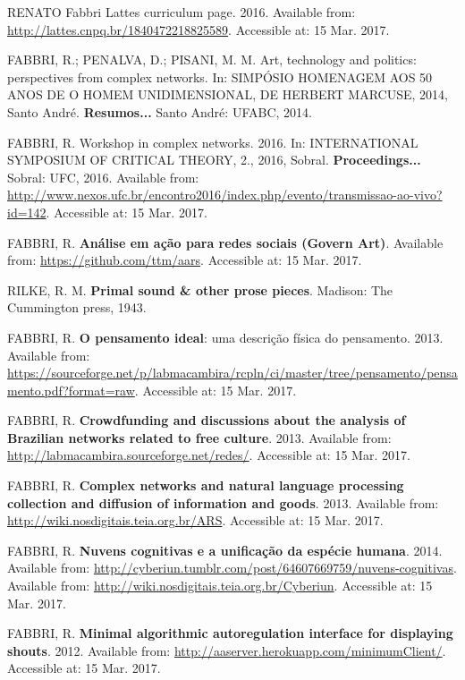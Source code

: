 \documentclass[
12pt,		%
openright,	%
twoside,  %
a4paper,			%
chapter=TITLE,		%
english,			%
french,				%
spanish,			%
brazil				%
]{USPSC}
\begin{document}
\begin{thebibliography}{999}
	RENATO Fabbri Lattes curriculum page. 2016. Available from: \url{http://lattes.cnpq.br/1840472218825589}. Accessible at: 15 Mar. 2017.

	FABBRI, R.; PENALVA, D.; PISANI, M. M. Art, technology and politics: perspectives from complex networks. In: SIMPÓSIO HOMENAGEM AOS 50 ANOS DE O HOMEM UNIDIMENSIONAL, DE HERBERT MARCUSE, 2014, Santo André. \textbf{Resumos...} Santo André: UFABC, 2014.

	FABBRI, R. Workshop in complex networks. 2016. In: INTERNATIONAL SYMPOSIUM OF CRITICAL THEORY, 2., 2016, Sobral. \textbf{Proceedings...} Sobral: UFC, 2016. Available from: \url{http://www.nexos.ufc.br/encontro2016/index.php/evento/transmissao-ao-vivo?id=142}. Accessible at: 15 Mar. 2017.

	FABBRI, R. \textbf{Análise em ação para redes sociais (Govern Art)}. Available from: \url{https://github.com/ttm/aars}. Accessible at: 15 Mar. 2017.

	RILKE, R. M. \textbf{Primal sound \& other prose pieces}. Madison: The Cummington press, 1943.

	FABBRI, R. \textbf{O pensamento ideal}: uma descrição física do pensamento. 2013. Available from: \url{https://sourceforge.net/p/labmacambira/rcpln/ci/master/tree/pensamento/pensamento.pdf?format=raw}. Accessible at: 15 Mar. 2017.

	FABBRI, R. \textbf{Crowdfunding and discussions about the analysis of Brazilian networks related to free culture}. 2013. Available from: \url{http://labmacambira.sourceforge.net/redes/}. Accessible at: 15 Mar. 2017.

	FABBRI, R. \textbf{Complex networks and natural language processing collection and diffusion of information and goods}. 2013. Available from: \url{http://wiki.nosdigitais.teia.org.br/ARS}. Accessible at: 15 Mar. 2017.

	FABBRI, R. \textbf{Nuvens cognitivas e a unificação da espécie humana}. 2014. Available from: \url{http://cyberiun.tumblr.com/post/64607669759/nuvens-cognitivas}.  Available from: \url{http://wiki.nosdigitais.teia.org.br/Cyberiun}. Accessible at: 15 Mar. 2017.

	FABBRI, R. \textbf{Minimal algorithmic autoregulation interface for displaying shouts}. 2012. Available from: \url{http://aaserver.herokuapp.com/minimumClient/}. Accessible at: 15 Mar. 2017.


\end{thebibliography}
\end{document}
